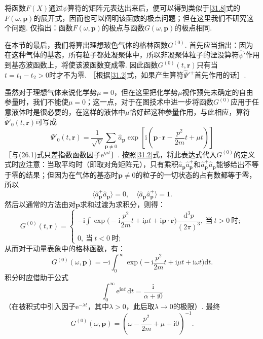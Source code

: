 将函数$F(X)$通过$\psi$算符的矩阵元表达出来后，便可以得到类似于\eqref{31.8}式的$F(\omega,\bm{p})$的展开式，因而也可以阐明该函数的极点问题；但在这里我们不研究这个问题. 仅指出：函数$F(\omega,\bm{p})$的极点与函数$G(\omega,\bm{p})$的极点相同.

在本节的最后，我们将算出理想玻色气体的格林函数$G^{(0)}$. 首先应当指出：因为在这种气体的基态，所有粒子都处凝聚体中，所以非凝聚体粒子的湮没算符$\hat{\psi}'$作用到基态波函数上，将使该波函数变成零. 因此函数$G^{(0)}(t,\bm{r})$只有当$t=t_{1}-t_{2}>0$时才不为零. ［根据\eqref{31.2}式，如果产生算符$\hat{\Psi}'^{+}$首先作用的话］.

虽然对于理想气体来说化学势$\mu=0$，但在这里把化学势$\mu$视作预先未确定的自由参量时，我们不能使$\mu=0$；这一点，对于在图技术中进一步将函数$G^{(0)}$应用于任意液体时是很必要的，在这样的液体中$\mu$恰好起这种参量作用，与此相应，算符$\hat{\Psi}'_{0}(t,\bm{r})$可写成
\begin{equation}
\hat{\Psi}'_{0}(t,\bm{r})=\frac{1}{\sqrt{V}}\sum_{\bm{p}\neq0}\hat{a}_{\bm{p}}
\exp\left[\mathrm{i}\left(\bm{p}\cdot\bm{r}-\frac{p^{2}}{2m}t+\mu t\right)\right]
\label{31.19}
\end{equation}
［与(26.1)式只差指数函数因子$\mathrm{e}^{\mathrm{i}\mu t}$］. 按照\eqref{31.2}式，将此表达式代入$G^{(0)}$的定义式时应注意：当取平均时（即取对角矩阵元），只有乘积$\hat{a}_{\bm{p}}\hat{a}^{+}_{\bm{p}}$和$\hat{a}^{+}_{\bm{p}}\hat{a}_{\bm{p}}$能够给出不等于零的结果；但因为在气体的基态时$\bm{p}\neq0$的粒子的一切状态的占有数都等于零，所以
\begin{equation*}
\langle\hat{a}^{+}_{\bm{p}}\hat{a}_{\bm{p}}\rangle=0,\quad
\langle\hat{a}_{\bm{p}}\hat{a}^{+}_{\bm{p}}\rangle=1.
\end{equation*}
然后以通常的方法由对$\bm{p}$求和过渡为求积分，则得：
\begin{equation}
G^{(0)}(t,\bm{r})=\left\{\begin{array}{l}
-\mathrm{i}\int\exp\Big(-\mathrm{i}\dfrac{p^{2}}{2m}t+\mathrm{i}\mu t+\mathrm{i}\bm{p}\cdot\bm{r}\Big)\dfrac{\mathrm{d}^{3}p}{(2\pi)^{3}},
\ \text{当}\ t>0\ \text{时};\\[1.2em]
0,\ \text{当}\ t<0\ \text{时};
\end{array}\right.
\label{31.20}
\end{equation}
从而对于动量表象中的格林函数，有：
\begin{equation*}
G^{(0)}(\omega,\bm{p})
=-\mathrm{i}\int_{0}^{\infty}\exp\Big(-\mathrm{i}\frac{p^{2}}{2m}t+\mathrm{i}\mu t+\mathrm{i}\omega t\Big)\mathrm{d}t.
\end{equation*}
积分时应借助于公式
\begin{equation}
\int_{0}^{\infty}\mathrm{e}^{\mathrm{i}\alpha t}\,\mathrm{d}t=\frac{\mathrm{i}}{\alpha+\mathrm{i}0}
\label{31.21}
\end{equation}
（在被积式中引入因子$\mathrm{e}^{-\lambda t}$，其中$\lambda>0$，此后取$\lambda\to0$的极限）. 最终
\begin{equation}
G^{(0)}(\omega,\bm{p})=\left(\omega-\frac{p^{2}}{2m}+\mu+\mathrm{i}0\right)^{-1}.
\label{31.22}
\end{equation}

